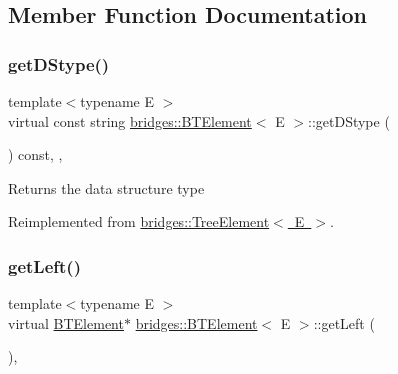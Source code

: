 \subsection{Member Function Documentation}
\mbox{\label{classbridges_1_1_b_t_element_a43cc18d2c1e71c399782a306b60e4260}} 
\subsubsection{\texorpdfstring{get\+D\+Stype()}{getDStype()}}
{\footnotesize\ttfamily template$<$typename E $>$ \\
virtual const string \mbox{\hyperlink{classbridges_1_1_b_t_element}{bridges\+::\+B\+T\+Element}}$<$ E $>$\+::get\+D\+Stype (\begin{DoxyParamCaption}{ }\end{DoxyParamCaption}) const\hspace{0.3cm}{\ttfamily [inline]}, {\ttfamily [override]}, {\ttfamily [virtual]}}

\begin{DoxyReturn}{Returns}
the data structure type 
\end{DoxyReturn}


Reimplemented from \mbox{\hyperlink{classbridges_1_1_tree_element_a6b264d7391442a742edf96bdd5ee5442}{bridges\+::\+Tree\+Element$<$ E $>$}}.

\mbox{\label{classbridges_1_1_b_t_element_ab5955c2611b6ae8c3c48508e3e983f87}} 
\subsubsection{\texorpdfstring{get\+Left()}{getLeft()}\hspace{0.1cm}{\footnotesize\ttfamily [1/2]}}
{\footnotesize\ttfamily template$<$typename E $>$ \\
virtual \mbox{\hyperlink{classbridges_1_1_b_t_element}{B\+T\+Element}}$\ast$ \mbox{\hyperlink{classbridges_1_1_b_t_element}{bridges\+::\+B\+T\+Element}}$<$ E $>$\+::get\+Left (\begin{DoxyParamCaption}{ }\end{DoxyParamCaption})\hspace{0.3cm}{\ttfamily [inline]}, {\ttfamily [virtual]}}

